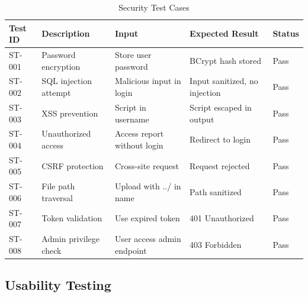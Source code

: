 \documentclass[12pt,a4paper]{article}
\begin{document}
    \begin{table}[H]
        \caption{Security Test Cases}
        \begin{tabular}{|p{2cm}|p{4cm}|p{3cm}|p{3cm}|p{1.5cm}|}
            \hline
            \textbf{Test ID} & \textbf{Description} & \textbf{Input} & \textbf{Expected Result} & \textbf{Status} \\
            \hline
            ST-001 & Password encryption & Store user password & BCrypt hash stored & Pass \\
            \hline
            ST-002 & SQL injection attempt & Malicious input in login & Input sanitized, no injection & Pass \\
            \hline
            ST-003 & XSS prevention & Script in username & Script escaped in output & Pass \\
            \hline
            ST-004 & Unauthorized access & Access report without login & Redirect to login & Pass \\
            \hline
            ST-005 & CSRF protection & Cross-site request & Request rejected & Pass \\
            \hline
            ST-006 & File path traversal & Upload with ../ in name & Path sanitized & Pass \\
            \hline
            ST-007 & Token validation & Use expired token & 401 Unauthorized & Pass \\
            \hline
            ST-008 & Admin privilege check & User access admin endpoint & 403 Forbidden & Pass \\
            \hline
        \end{tabular}
    \end{table}

    \subsection{Usability Testing}
\end{document}
